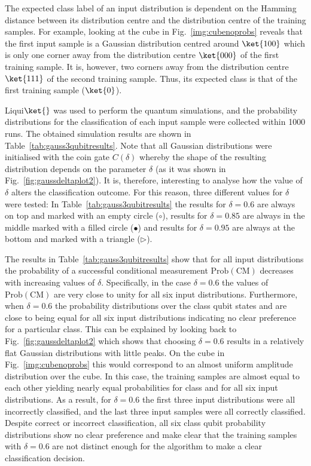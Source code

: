 The expected class label of an input distribution is dependent on the Hamming distance between its distribution centre and the distribution centre of the training samples. For example, looking at the cube in Fig.~\ref{img:cubenoprobs} reveals that the first input sample is a Gaussian distribution centred around $\ket{100}$ which is only one corner away from the distribution centre $\ket{000}$ of the first training sample. It is, however, two corners away from the distribution centre $\ket{111}$ of the second training sample. Thus, its expected class is that of the first training sample ($\ket{0}$).

Liqui$\ket{}$ was used to perform the quantum simulations, and the probability distributions for the classification of each input sample were collected within 1000 runs. The obtained simulation results are shown in Table~\ref{tab:gauss3qubitresults}. Note that all Gaussian distributions were initialised with the coin gate $C(\delta)$ whereby the shape of the resulting distribution depends on the parameter $\delta$ (as it was shown in Fig.~\ref{fig:gaussdeltaplot2}). It is, therefore, interesting to analyse how the value of $\delta$ alters the classification outcome. For this reason, three different values for $\delta$ were tested: In Table~\ref{tab:gauss3qubitresults} the results for $\delta = 0.6$ are always on top and marked with an empty circle ($\circ$), results for $\delta = 0.85$ are always in the middle marked with a filled circle ($\bullet$) and results for $\delta = 0.95$ are always at the bottom and marked with a triangle ($\triangleright$).

The results in Table~\ref{tab:gauss3qubitresults} show that for all input distributions the probability of a successful conditional measurement $\mathrm{Prob}(\mathrm{CM})$ decreases with increasing values of $\delta$. Specifically, in the case $\delta = 0.6$ the values of $\mathrm{Prob}(\mathrm{CM})$ are very close to unity for all six input distributions. Furthermore, when $\delta = 0.6$ the probability distributions over the class qubit states \0 and \1 are close to being equal for all six input distributions indicating no clear preference for a particular class. This can be explained by looking back to Fig.~\ref{fig:gaussdeltaplot2} which shows that choosing $\delta = 0.6$ results in a relatively flat Gaussian distributions with little peaks. On the cube in Fig.~\ref{img:cubenoprobs} this would correspond to an almost uniform amplitude distribution over the cube. In this case, the training samples are almost equal to each other yielding nearly equal probabilities for class \0 and \1 for all six input distributions. As a result, for $\delta = 0.6$ the first three input distributions were all incorrectly classified, and the last three input samples were all correctly classified. Despite correct or incorrect classification, all six class qubit probability distributions show no clear preference and make clear that the training samples with $\delta = 0.6$ are not distinct enough for the algorithm to make a clear classification decision.

